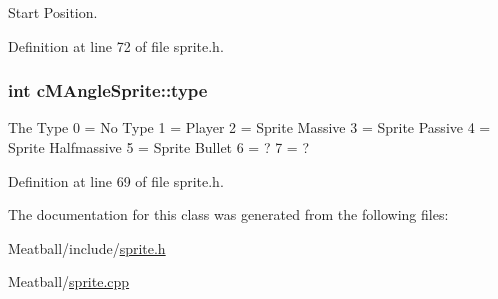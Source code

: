 Start Position. 



Definition at line 72 of file sprite.\-h.

\hypertarget{classc_m_angle_sprite_ac3ca3aa45f5731675f8a61b89f094cc4}{
\subsubsection[{type}]{\setlength{\rightskip}{0pt plus 5cm}int c\-M\-Angle\-Sprite\-::type}}\label{classc_m_angle_sprite_ac3ca3aa45f5731675f8a61b89f094cc4}
The Type 0 = No Type 1 = Player 2 = Sprite Massive 3 = Sprite Passive 4 = Sprite Halfmassive 5 = Sprite Bullet 6 = ? 7 = ? 

Definition at line 69 of file sprite.\-h.



The documentation for this class was generated from the following files\-:\begin{DoxyCompactItemize}
\item 
Meatball/include/\hyperlink{sprite_8h}{sprite.\-h}\item 
Meatball/\hyperlink{sprite_8cpp}{sprite.\-cpp}\end{DoxyCompactItemize}
